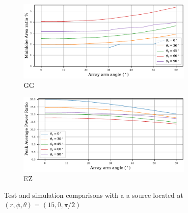 \begin{figure}[h!]
	\centering
	\begin{subfigure}[b]{1\textwidth}
		\centering
		\includegraphics[width=0.95\textwidth]{images/5_array_evaluation/tilt_area.pdf}
		\caption{GG}
		\label{fig:finartilt}
	\end{subfigure}
	\begin{subfigure}[b]{1\textwidth}
		\centering
		\includegraphics[width=0.95\textwidth]{images/5_array_evaluation/tilt_PAP.pdf}
		\caption{EZ}
		\label{fig:finpaptilt}
	\end{subfigure}
	\caption{Test and simulation comparisons with a a source located at $(r, \phi, \theta) = (15, 0, \pi/2)$}
	\label{fig:fintilt}
\end{figure}



